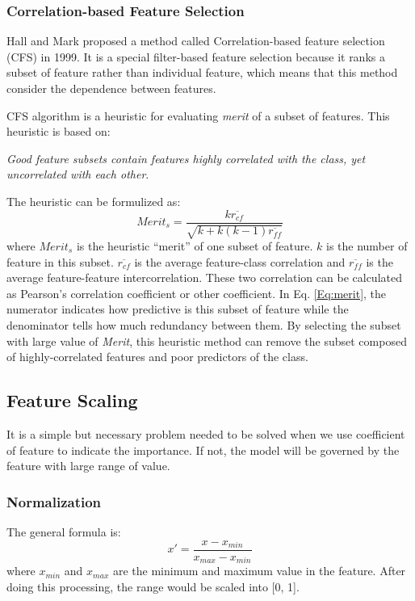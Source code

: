 \subsubsection{Correlation-based Feature Selection}
Hall and Mark proposed a method called Correlation-based feature selection (CFS)\cite{hall1999correlation} in 1999. It is a special filter-based feature selection because it ranks a subset of feature rather than individual feature, which means that this method consider the dependence between features.

CFS algorithm is a heuristic for evaluating \textit{merit} of a subset of features. This heuristic is based on:

\textit{Good feature subsets contain features highly correlated with the class, yet uncorrelated with each other}\cite{hall2000textordfemininecorrelation}.

The heuristic can be formulized as:
\begin{equation} \label{Eq:merit}
Merit_s=\frac{k\overline{r_{cf}}}{\sqrt{k+k(k-1)\overline{r_{ff}}}}
\end{equation}
where $Merit_s$ is the heuristic ``merit'' of one subset of feature. $k$ is the number of feature in this subset. $\overline{r_{cf}}$ is the average feature-class correlation and $\overline{r_{ff}}$ is the average feature-feature intercorrelation. These two correlation can be calculated as Pearson's correlation coefficient or other coefficient. In Eq. \ref{Eq:merit}, the numerator indicates how predictive is this subset of feature while the denominator tells how much redundancy between them. By selecting the subset with large value of \textit{Merit}, this heuristic method can remove the subset composed of highly-correlated features and poor predictors of the class.

\subsection{Feature Scaling}
It is a simple but necessary problem needed to be solved when we use coefficient of feature to indicate the importance. If not, the model will be governed by the feature with large range of value.

\subsubsection{Normalization}
The general formula is:
\begin{equation} \label{normalization}
x'=\frac{x-x_{min}}{x_{max}-x_{min}}
\end{equation}
where $x_{min}$ and $x_{max}$ are the minimum and maximum value in the feature. After doing this processing, the range would be scaled into [0, 1].
